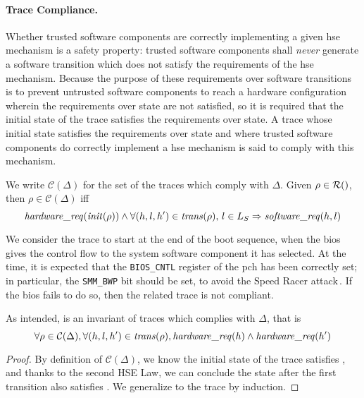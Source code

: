 \paragraph{Trace Compliance.}
%
Whether trusted software components are correctly implementing a given \ac{hse}
mechanism is a safety property: trusted software components shall \emph{never}
generate a software transition which does not satisfy the requirements of the
\ac{hse} mechanism.
%
Because the purpose of these requirements over software transitions is to
prevent untrusted software components to reach a hardware configuration wherein
the requirements over state are not satisfied, so it is required that the
initial state of the trace satisfies the requirements over state.
%
A trace whose initial state satisfies the requirements over state and where
trusted software components do correctly implement a \ac{hse} mechanism is said
to comply with this mechanism.
%
\begin{definition}
  We write $\mathcal{C}(\Delta)$ for the set of the traces which comply with
  $\Delta$.
  Given $\rho \in \pathesLTS{Ez}$, then $\rho \in \mathcal{C}(\Delta)$ iff
  \[
    \mathit{hardware\_req}(\mathit{init}(\rho)) \wedge \forall (h,l,h') \in
    \mathit{trans}(\rho)\text{, }l \in L_S \Rightarrow \mathit{software\_req}(h, l)
  \]
\end{definition}

\begin{example}
  We consider the trace to start at the end of the boot sequence, when the
  \ac{bios} gives the control flow to the system software component it has
  selected.
  At the time, it is expected that the \texttt{BIOS\_CNTL} register of the
  \ac{pch} has been correctly set; in particular, the \texttt{SMM\_BWP} bit
  should be set, to avoid the Speed Racer
  attack\,\cite{kallenberg2015racecondition}.
  If the \ac{bios} fails to do so, then the related trace is not compliant.
\end{example}

\begin{lemma}
  \label{lemma:speccert:hseinv}
  As intended,  is an invariant of traces which complies
  with $\Delta$, that is
  \[
    \forall \rho \in \mathcal{C}(\Delta), \forall (h, l, h') \in
    \mathit{trans}(\rho), \mathit{hardware\_req}(h) \wedge \mathit{hardware\_req}(h')
  \]

  \begin{proof}
    By definition of $\mathcal{C}(\Delta)$, we know the initial state of the
    trace satisfies , and thanks to the second HSE Law, we
    can conclude the state after the first transition also satisfies
    .
    We generalize to the trace by induction.
  \end{proof}
\end{lemma}


